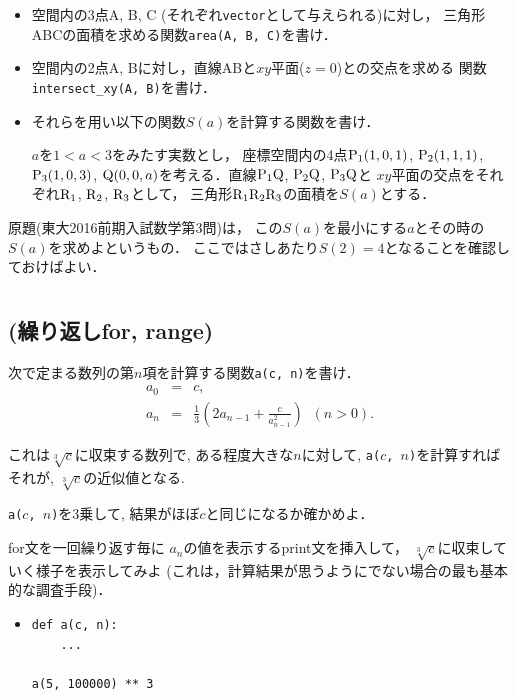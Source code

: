 \documentclass[10pt,dvipdfmx]{article}
\begin{document}
\begin{itemize}
\item 空間内の3点A, B, C (それぞれ{\tt vector}として与えられる)に対し，
三角形ABCの面積を求める関数{\tt area(A, B, C)}を書け．

\item 空間内の2点A, Bに対し，直線ABと$xy$平面($z = 0$)との交点を求める
関数 {\tt intersect\_xy(A, B)}を書け．

\item それらを用い以下の関数$S(a)$を計算する関数を書け．

$a$を$1 < a < 3$をみたす実数とし，
座標空間内の4点${\rm P}_1(1,0,1)$, ${\rm P}_2(1,1,1)$, ${\rm P}_3(1,0,3)$,
${\rm Q}(0,0,a)$を考える．直線${\rm P}_1{\rm Q}$, ${\rm P}_2{\rm Q}$, 
${\rm P}_3{\rm Q}$と
$xy$平面の交点をそれぞれ${\rm R}_1$, ${\rm R}_2$, ${\rm R}_3$として，
三角形${\rm R}_1{\rm R}_2{\rm R}_3$の面積を$S(a)$とする．
\end{itemize}

{\footnotesize 原題(東大2016前期入試数学第3問)は，
この$S(a)$を最小にする$a$とその時の$S(a)$を求めよというもの．
ここではさしあたり$S(2) = 4$となることを確認しておけばよい．}

\newpage
\section{}

\subsection{{\scriptsize (繰り返しfor, range)}}\label{sec:newton}
次で定まる数列の第$n$項を計算する関数{\tt a(c, n)}を書け．
\begin{eqnarray}
a_0 & = & c, \\
a_n & = & \frac{1}{3} \left(2a_{n-1} + \frac{c}{a_{n-1}^2}\right) \;\; (n > 0).
\end{eqnarray}

これは$\sqrt[3]{c}$に収束する数列で, 
ある程度大きな$n$に対して, 
{\tt a($c$, $n$)}を計算すればそれが, $\sqrt[3]{c}$の近似値となる.

{\tt a($c$, $n$)}を3乗して, 結果がほぼ$c$と同じになるか確かめよ．

for文を一回繰り返す毎に
$a_n$の値を表示するprint文を挿入して，
$\sqrt[3]{c}$に収束していく様子を表示してみよ
(これは，計算結果が思うようにでない場合の最も基本的な調査手段)．

\begin{itemize}
\item []
\begin{lstlisting}
def a(c, n):
    ...  

a(5, 100000) ** 3
\end{lstlisting}
\end{itemize}
\end{document}
